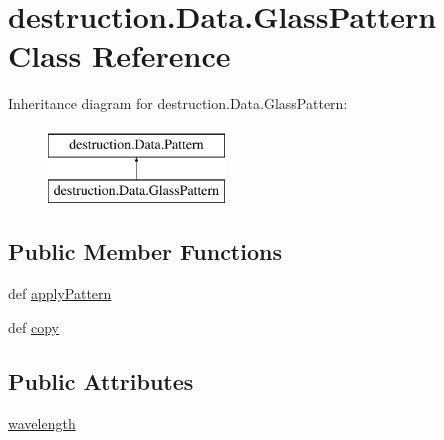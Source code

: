 \hypertarget{classdestruction_1_1_data_1_1_glass_pattern}{\section{destruction.\-Data.\-Glass\-Pattern Class Reference}
\label{classdestruction_1_1_data_1_1_glass_pattern}
}
Inheritance diagram for destruction.\-Data.\-Glass\-Pattern\-:\begin{figure}[H]
\begin{center}
\leavevmode
\includegraphics[height=2.000000cm]{classdestruction_1_1_data_1_1_glass_pattern}
\end{center}
\end{figure}
\subsection*{Public Member Functions}
\begin{DoxyCompactItemize}
\item 
def \hyperlink{classdestruction_1_1_data_1_1_glass_pattern_ae34d176fe19894f796d133767652f020}{apply\-Pattern}
\item 
def \hyperlink{classdestruction_1_1_data_1_1_glass_pattern_a48c36cb7aa11a27375df3ef2f7ee177e}{copy}
\end{DoxyCompactItemize}
\subsection*{Public Attributes}
\begin{DoxyCompactItemize}
\item 
\hyperlink{classdestruction_1_1_data_1_1_glass_pattern_ad2fe0a72cee46d5f3dd9ba8890490e45}{wavelength}
\end{DoxyCompactItemize}


